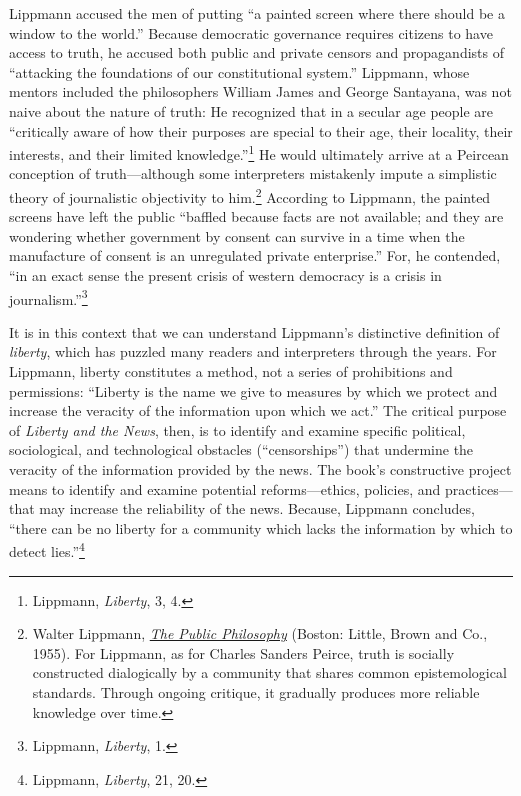 \documentclass[openany,nobib,twoside,nohyper]{tufte-book}
\begin{document}
Lippmann accused the men of putting ``a painted screen where there
should be a window to the world.'' Because democratic governance
requires citizens to have access to truth, he accused both public and
private censors and propagandists of ``attacking the foundations of our
constitutional system.'' Lippmann, whose mentors included the
philosophers William James and George Santayana, was not naive about the
nature of truth: He recognized that in a secular age people are
``critically aware of how their purposes are special to their age, their
locality, their interests, and their limited
knowledge.''\footnote{Lippmann, \emph{Liberty}, 3, 4.} He would ultimately
arrive at a Peircean conception of truth---although some interpreters
mistakenly impute a simplistic theory of journalistic objectivity to
him.\footnote{Walter Lippmann,
  \emph{\href{http://www.worldcat.org/oclc/976578926}{The Public
  Philosophy}} (Boston: Little, Brown and Co., 1955). For Lippmann, as
  for Charles Sanders Peirce, truth is socially constructed dialogically
  by a community that shares common epistemological standards. Through
  ongoing critique, it gradually produces more reliable knowledge over
  time.} According to Lippmann, the
painted screens have left the public ``baffled because facts are not
available; and they are wondering whether government by consent can
survive in a time when the manufacture of consent is an unregulated
private enterprise.'' For, he contended, ``in an exact sense the present
crisis of western democracy is a crisis in
journalism.''\footnote{Lippmann, \emph{Liberty}, 1.}

It is in this context that we can understand Lippmann's distinctive
definition of \emph{liberty}, which has puzzled many readers and
interpreters through the years. For Lippmann, liberty constitutes a
method, not a series of prohibitions and permissions: ``Liberty is the
name we give to measures by which we protect and increase the veracity
of the information upon which we act.'' The critical purpose of
\emph{Liberty and the News}, then, is to identify and examine specific
political, sociological, and technological obstacles (``censorships'')
that undermine the veracity of the information provided by the news. The
book's constructive project means to identify and examine potential
reforms---ethics, policies, and practices---that may increase the
reliability of the news. Because, Lippmann concludes, ``there can be no
liberty for a community which lacks the information by which to detect
lies.''\footnote{Lippmann, \emph{Liberty}, 21, 20.}
\end{document}
